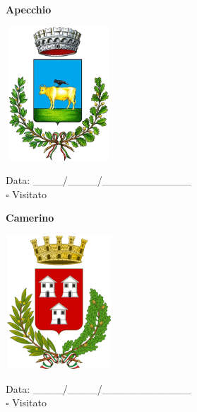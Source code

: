 \documentclass[a5paper,12pt]{article}
\begin{document}
\vspace{0.7cm}

\noindent
\begin{minipage}[t]{0.45\textwidth}
    \begin{center}
        \textbf{Apecchio}
    \end{center}
    \vspace{-0.5cm} %
    \begin{center}
        \includegraphics[height= 5cm, width=4cm]{Marche/Stemma Apecchio.png}
    \end{center}
    \vspace{-0.4cm} %
    \begin{flushleft}
        Data: \_\_\_\_/\_\_\_\_/\_\_\_\_\_\_\_\_\_\_\_\_ \\
        $\square$ Visitato
    \end{flushleft}
\end{minipage}
\hfill
\noindent
\begin{minipage}[t]{0.45\textwidth}
    \begin{center}
        \textbf{Camerino}
    \end{center}
    \vspace{-0.5cm} %
    \begin{center}
        \includegraphics[height= 5cm, width=4cm]{Marche/Stemma Camerino.png}
    \end{center}
    \vspace{-0.4cm} %
    \begin{flushleft}
        Data: \_\_\_\_/\_\_\_\_/\_\_\_\_\_\_\_\_\_\_\_\_ \\
        $\square$ Visitato
    \end{flushleft}
\end{minipage}
\end{document}
